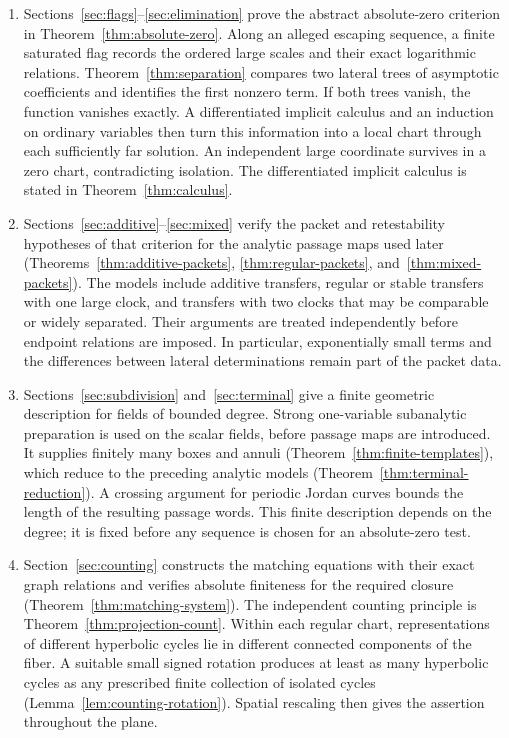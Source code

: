 \begin{enumerate}[label=\arabic*.]
\item
Sections~\ref{sec:flags}--\ref{sec:elimination} prove the abstract
absolute-zero criterion in Theorem~\ref{thm:absolute-zero}. Along an alleged escaping sequence, a finite
saturated flag records the ordered large scales and their exact
logarithmic relations. Theorem~\ref{thm:separation} compares two lateral trees
of asymptotic coefficients and identifies the first nonzero term. If
both trees vanish, the function vanishes exactly. A differentiated
implicit calculus and an induction on ordinary variables then turn this
information into a local chart through each sufficiently far solution.
An independent large coordinate survives in a zero chart, contradicting
isolation. The differentiated implicit calculus is stated in
Theorem~\ref{thm:calculus}.

\item
Sections~\ref{sec:additive}--\ref{sec:mixed} verify the packet and
retestability hypotheses of that criterion for the analytic passage maps
used later
(Theorems~\ref{thm:additive-packets}, \ref{thm:regular-packets},
and~\ref{thm:mixed-packets}). The models
include additive transfers, regular or stable transfers with one large
clock, and transfers with two clocks that may be comparable or widely
separated. Their arguments are treated independently
before endpoint relations are imposed. In particular, exponentially
small terms and the differences between lateral determinations remain
part of the packet data.

\item
Sections~\ref{sec:subdivision} and~\ref{sec:terminal} give a finite
geometric description for fields of bounded degree. Strong
one-variable subanalytic preparation is used on the scalar fields,
before passage maps are introduced. It supplies finitely many boxes
and annuli (Theorem~\ref{thm:finite-templates}), which reduce to the
preceding analytic models (Theorem~\ref{thm:terminal-reduction}).
A crossing argument for periodic Jordan curves bounds the length of
the resulting passage words. This finite description depends on the
degree; it is fixed before any sequence is chosen for an absolute-zero
test.

\item
Section~\ref{sec:counting} constructs the matching equations with their
exact graph relations and verifies absolute finiteness for the required
closure (Theorem~\ref{thm:matching-system}). The independent counting
principle is Theorem~\ref{thm:projection-count}.
Within each regular chart, representations of different hyperbolic
cycles lie in different connected components of the fiber.
A suitable small signed rotation produces at least as many hyperbolic
cycles as any prescribed finite collection of isolated cycles
(Lemma~\ref{lem:counting-rotation}). Spatial rescaling then gives the
assertion throughout the plane.
\end{enumerate}


